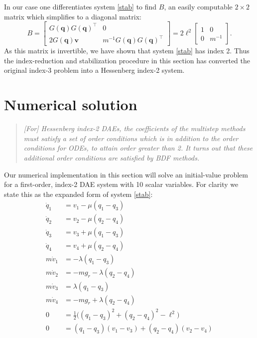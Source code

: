 \documentclass[letterpaper,final,12pt,reqno]{amsart}
\newcommand{\bq}{\mathbf{q}}
\newcommand{\bv}{\mathbf{v}}
\begin{document}
In our case one differentiates system \eqref{stab} to find $B$, an easily computable $2\times 2$ matrix which simplifies to a diagonal matrix:
\begin{equation}
B = \begin{bmatrix}  G(\bq) G(\bq)^\top & 0 \\ 2 G(\bq) \bv & m^{-1} G(\bq) G(\bq)^\top \end{bmatrix} = 2\ell^2 \begin{bmatrix}  1 & 0 \\ 0 & m^{-1} \end{bmatrix}.
\end{equation}
As this matrix is invertible, we have shown that system \eqref{stab} has index 2.  Thus the index-reduction and stabilization procedure in this section has converted the original index-3 problem into a Hessenberg index-2 system.


\section{Numerical solution}

\begin{quote}
\emph{[For] Hessenberg index-2 DAEs, the coefficients of the multistep methods must satisfy a set of order conditions which is in addition to the order conditions for ODEs, to attain order greater than 2.  It turns out that these additional order conditions are satisfied by BDF methods.} \, \cite[p 267]{AscherPetzold1998}
\end{quote}

Our numerical implementation in this section will solve an initial-value problem for a first-order, index-2 DAE system with 10 scalar variables.  For clarity we state this as the expanded form of system \eqref{stab}:
\begin{subequations}
\label{rawstab}
\begin{align}
  \dot q_1 &= v_1 - \mu (q_1 - q_3) \\
  \dot q_2 &= v_2 - \mu (q_2 - q_4) \\
  \dot q_3 &= v_3 + \mu (q_1 - q_3) \\
  \dot q_4 &= v_4 + \mu (q_2 - q_4) \\
m \dot v_1 &= - \lambda (q_1 - q_3) \\
m \dot v_2 &= - m g_r - \lambda (q_2 - q_4) \\
m \dot v_3 &= \lambda (q_1 - q_3) \\
m \dot v_4 &= - m g_r + \lambda (q_2 - q_4) \\
         0 &= \frac{1}{2} \Big((q_1 - q_3)^2 + (q_2 - q_4)^2 - \ell^2\Big) \\
         0 &= (q_1 - q_3) (v_1 - v_3) + (q_2 - q_4) (v_2 - v_4)
\end{align}
\end{subequations}
\end{document}
